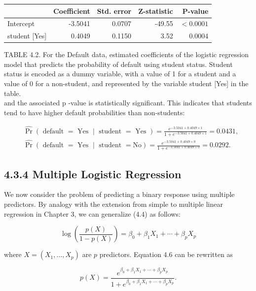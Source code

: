 \documentclass[10pt]{article}
\begin{document}
\begin{center}
\begin{tabular}{lrrrr}
\hline
 & Coefficient & Std. error & Z-statistic & P-value \\
\hline
Intercept & -3.5041 & 0.0707 & -49.55 & $<0.0001$ \\
student [Yes] & 0.4049 & 0.1150 & 3.52 & 0.0004 \\
\hline
\end{tabular}
\end{center}

TABLE 4.2. For the Default data, estimated coefficients of the logistic regression model that predicts the probability of default using student status. Student status is encoded as a dummy variable, with a value of 1 for a student and a value of 0 for a non-student, and represented by the variable student [Yes] in the table.\\
and the associated p -value is statistically significant. This indicates that students tend to have higher default probabilities than non-students:

$$
\begin{aligned}
& \widehat{\operatorname{Pr}}(\text { default }=\text { Yes } \mid \text { student }=\text { Yes })=\frac{e^{-3.5041+0.4049 \times 1}}{1+e^{-3.5041+0.4049 \times 1}}=0.0431, \\
& \widehat{\operatorname{Pr}}(\text { default }=\text { Yes } \mid \text { student }=\mathrm{No})=\frac{e^{-3.5041+0.4049 \times 0}}{1+e^{-3.5041+0.4049 \times 0}}=0.0292 .
\end{aligned}
$$

\subsection*{4.3.4 Multiple Logistic Regression}
We now consider the problem of predicting a binary response using multiple predictors. By analogy with the extension from simple to multiple linear regression in Chapter 3, we can generalize (4.4) as follows:


\begin{equation*}
\log \left(\frac{p(X)}{1-p(X)}\right)=\beta_{0}+\beta_{1} X_{1}+\cdots+\beta_{p} X_{p} \tag{4.6}
\end{equation*}


where $X=\left(X_{1}, \ldots, X_{p}\right)$ are $p$ predictors. Equation 4.6 can be rewritten as


\begin{equation*}
p(X)=\frac{e^{\beta_{0}+\beta_{1} X_{1}+\cdots+\beta_{p} X_{p}}}{1+e^{\beta_{0}+\beta_{1} X_{1}+\cdots+\beta_{p} X_{p}}} . \tag{4.7}
\end{equation*}
\end{document}
